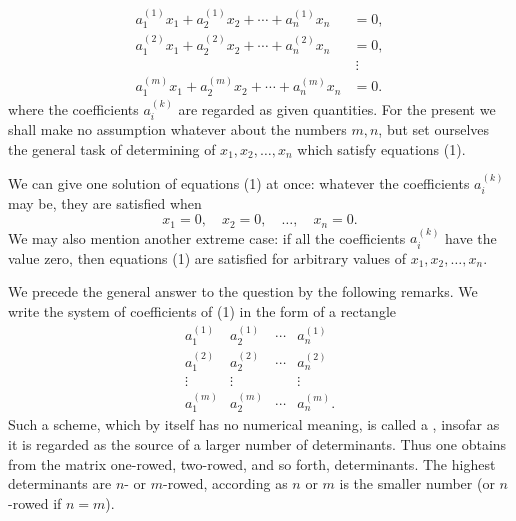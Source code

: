 
\begin{equation}
\begin{aligned}
 a_1^{(1)}x_1+a_2^{(1)}x_2+\cdots+a_n^{(1)}x_n&=0,\\
 a_1^{(2)}x_1+a_2^{(2)}x_2+\cdots+a_n^{(2)}x_n&=0,\\
 &\ \vdots\\
 a_1^{(m)}x_1+a_2^{(m)}x_2+\cdots+a_n^{(m)}x_n&=0.
\end{aligned}
\tag{1}
\end{equation}
where the coefficients \(a_i^{(k)}\) are regarded as given quantities. For the present we shall make no assumption whatever about the numbers \(m,n\), but set ourselves the general task of determining  of \(x_1,x_2,\ldots,x_n\) which satisfy equations (1).

We can give one solution of equations (1) at once: whatever the coefficients \(a_i^{(k)}\) may be, they are satisfied when
\begin{equation}
        x_1=0,\quad x_2=0,\quad\ldots,\quad x_n=0.
\tag{2}
\end{equation}
We may also mention another extreme case: if all the coefficients \(a_i^{(k)}\) have the value zero, then equations (1) are satisfied for arbitrary values of \(x_1,x_2,\ldots,x_n\).

We precede the general answer to the question by the following remarks. We write the system of coefficients of (1) in the form of a rectangle
\begin{equation}
\begin{array}{cccc}
 a_1^{(1)}&a_2^{(1)}&\cdots&a_n^{(1)}\\
 a_1^{(2)}&a_2^{(2)}&\cdots&a_n^{(2)}\\
 \vdots&\vdots&&\vdots\\
 a_1^{(m)}&a_2^{(m)}&\cdots&a_n^{(m)}.
\end{array}
\tag{3}
\end{equation}
Such a scheme, which by itself has no numerical meaning, is called a , insofar as it is regarded as the source of a larger number of determinants.  Thus one obtains from the matrix one-rowed, two-rowed, and so forth, determinants. The highest determinants are \(n\)- or \(m\)-rowed, according as \(n\) or \(m\) is the smaller number (or \(n\)-rowed if \(n=m\)).
